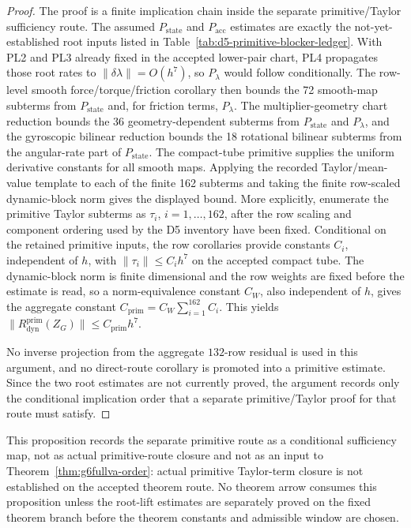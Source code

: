 \documentclass[preprint,12pt]{elsarticle}
\begin{document}
\begin{proof}
The proof is a finite implication chain inside the separate primitive/Taylor sufficiency route.  The
assumed \(P_{\mathrm{state}}\) and \(P_{\mathrm{acc}}\) estimates are exactly
the not-yet-established root inputs listed in
Table~\ref{tab:d5-primitive-blocker-ledger}.
With PL2 and PL3 already fixed in the accepted lower-pair chart, PL4
propagates those root rates to
\(\|\delta\lambda\|=O(h^7)\), so \(P_{\lambda}\) would follow conditionally.  The
row-level smooth force/torque/friction corollary then bounds the 72 smooth-map
subterms from \(P_{\mathrm{state}}\) and, for friction terms,
\(P_{\lambda}\).  The multiplier-geometry chart reduction bounds the 36 geometry-dependent
subterms from \(P_{\mathrm{state}}\) and \(P_{\lambda}\), and the gyroscopic
bilinear reduction bounds the 18 rotational bilinear subterms from the
angular-rate part of \(P_{\mathrm{state}}\).  The compact-tube primitive
supplies the uniform derivative constants for all smooth maps.  Applying the
recorded Taylor/mean-value template to each of the finite 162 subterms and
taking the finite row-scaled dynamic-block norm gives the displayed bound.
More explicitly, enumerate the primitive Taylor subterms as
\(\tau_i\), \(i=1,\ldots,162\), after the row scaling and component ordering
used by the D5 inventory have been fixed.  Conditional on the retained
primitive inputs, the row corollaries provide constants \(C_i\), independent
of \(h\), with \(\|\tau_i\|\le C_i h^7\) on the accepted compact tube.  The
dynamic-block norm is finite dimensional and the row weights are fixed before
the estimate is read, so a norm-equivalence constant \(C_W\), also independent
of \(h\), gives the aggregate constant
\(C_{\mathrm{prim}}=C_W\sum_{i=1}^{162} C_i\).  This yields
\(\|R_{\mathrm{dyn}}^{\mathrm{prim}}(Z_G)\|\le C_{\mathrm{prim}}h^7\).

No inverse projection from the aggregate \(132\)-row residual is used in this
argument, and no direct-route corollary is promoted into a primitive
estimate.  Since the two root estimates are not currently proved, the
argument records only the conditional implication order that a separate
primitive/Taylor proof for that route must satisfy.
\end{proof}

This proposition records the separate primitive route as a conditional
sufficiency map, not as actual primitive-route closure and not as
an input to Theorem~\ref{thm:g6fullva-order}: actual primitive Taylor-term
closure is not established on the accepted theorem route.  No theorem arrow consumes this
proposition unless the root-lift estimates are separately proved on the fixed
theorem branch before the theorem constants and admissible window are chosen.
\end{document}
